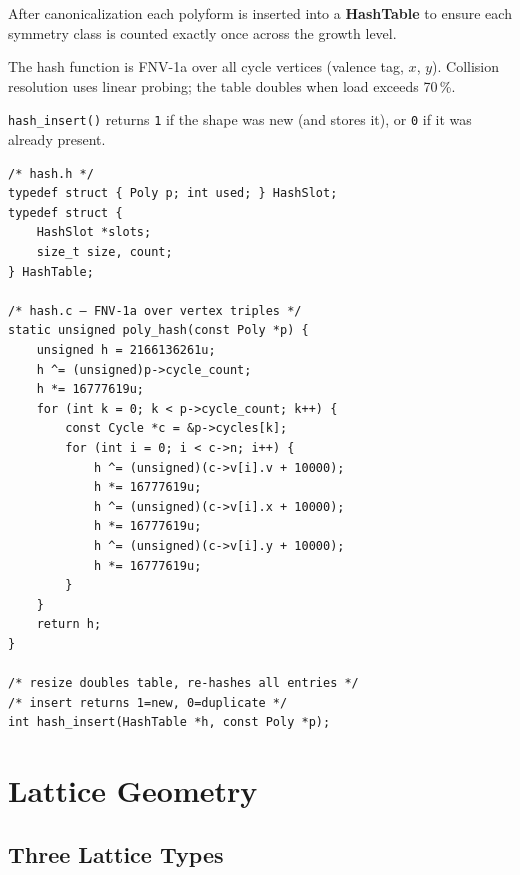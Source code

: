 \documentclass[10pt,a4paper]{article}
\newcommand{\code}[1]{\texttt{\small #1}}
\newcommand{\file}[1]{\texttt{\footnotesize #1}}
\begin{document}
\begin{tcolorbox}[dualbox, title=Open-addressing Hash Table — \file{src/core/hash.h\,/\,hash.c}]
  After canonicalization each polyform is inserted into a
  \textbf{HashTable} to ensure each symmetry class is counted exactly
  once across the growth level.

  The hash function is FNV-1a over all cycle vertices (valence tag,
  $x$, $y$).  Collision resolution uses linear probing; the table
  doubles when load exceeds 70\,\%.

  \code{hash\_insert()} returns \code{1} if the shape was new
  (and stores it), or \code{0} if it was already present.
\tcblower
\begin{verbatim}
/* hash.h */
typedef struct { Poly p; int used; } HashSlot;
typedef struct {
    HashSlot *slots;
    size_t size, count;
} HashTable;

/* hash.c — FNV-1a over vertex triples */
static unsigned poly_hash(const Poly *p) {
    unsigned h = 2166136261u;
    h ^= (unsigned)p->cycle_count;
    h *= 16777619u;
    for (int k = 0; k < p->cycle_count; k++) {
        const Cycle *c = &p->cycles[k];
        for (int i = 0; i < c->n; i++) {
            h ^= (unsigned)(c->v[i].v + 10000);
            h *= 16777619u;
            h ^= (unsigned)(c->v[i].x + 10000);
            h *= 16777619u;
            h ^= (unsigned)(c->v[i].y + 10000);
            h *= 16777619u;
        }
    }
    return h;
}

/* resize doubles table, re-hashes all entries */
/* insert returns 1=new, 0=duplicate */
int hash_insert(HashTable *h, const Poly *p);
\end{verbatim}
\end{tcolorbox}

\section{Lattice Geometry}

\subsection{Three Lattice Types}
\end{document}
